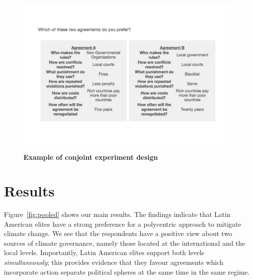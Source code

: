 \documentclass[a4paper,12pt]{article}
\begin{document}
\begin{figure}[H]
	\centering
	\includegraphics[width=16cm]{conjoint-cropped.pdf}
	\caption{\textbf{Example of conjoint experiment design}}
	\label{fig:conjoint}
\end{figure}


\section{Results}%
\label{sec:results}

Figure~\ref{fig:pooled} shows our main results. The findings indicate that Latin American elites have a strong preference for a polycentric approach to mitigate climate change. We see that the respondents have a positive view about two sources of climate governance, namely those located at the international and the local levels. Importantly, Latin American elites support both levels \textit{simultaneously}; this provides evidence that they favour agreements which incorporate action separate political spheres at the same time in the same regime. 
\end{document}
